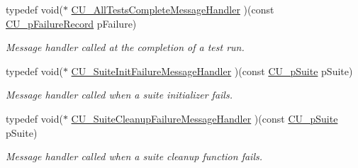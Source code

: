 \begin{DoxyCompactItemize}
typedef void($\ast$ \hyperlink{group__Framework_ga5c8cffc5ce2801990436b3e6992bf770}{C\-U\-\_\-\-All\-Tests\-Complete\-Message\-Handler} )(const \hyperlink{group__Framework_gafe3d04f76bf2fac18a3b6a9fd9368308}{C\-U\-\_\-p\-Failure\-Record} p\-Failure)
\begin{DoxyCompactList}\small\item\em Message handler called at the completion of a test run. \end{DoxyCompactList}\item 
typedef void($\ast$ \hyperlink{group__Framework_ga53faf49a6045a1fc32c5a0287b800b65}{C\-U\-\_\-\-Suite\-Init\-Failure\-Message\-Handler} )(const \hyperlink{group__Framework_gaba832ae8b235f5e70d6a4ac9c3bb1219}{C\-U\-\_\-p\-Suite} p\-Suite)
\begin{DoxyCompactList}\small\item\em Message handler called when a suite initializer fails. \end{DoxyCompactList}\item 
typedef void($\ast$ \hyperlink{group__Framework_ga67a720062975e6b7f97df16a1e8e10ce}{C\-U\-\_\-\-Suite\-Cleanup\-Failure\-Message\-Handler} )(const \hyperlink{group__Framework_gaba832ae8b235f5e70d6a4ac9c3bb1219}{C\-U\-\_\-p\-Suite} p\-Suite)
\begin{DoxyCompactList}\small\item\em Message handler called when a suite cleanup function fails. \end{DoxyCompactList}\end{DoxyCompactItemize}

